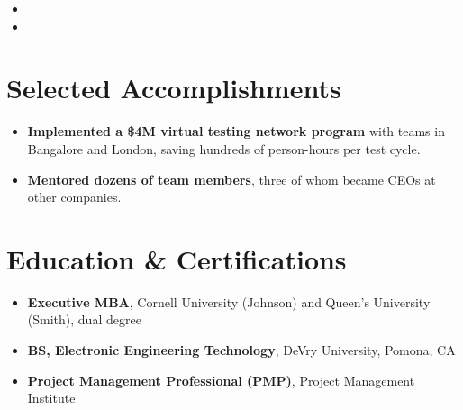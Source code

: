 \documentclass[11pt,letterpaper,sans]{moderncv}
\begin{document}
\begin{itemize}
\vspace{3pt}

\item{}

\vspace{3pt}

\item{}

\end{itemize}


\section{Selected Accomplishments}
\vspace{1pt}
\begin{itemize}
\item {\textbf{Implemented a \$4M virtual testing network program} with teams in Bangalore and London, saving hundreds of person-hours per test cycle.}
\item {\textbf{Mentored dozens of team members}, three of whom became CEOs at other companies.}
\end{itemize}


\section{Education \& Certifications}
\vspace{1pt}
\begin{itemize}
\item{\textbf{Executive MBA}, Cornell University (Johnson) and Queen's University (Smith), dual degree}
\item{\textbf{BS, Electronic Engineering Technology}, DeVry University, Pomona, CA}
\item{\textbf{Project Management Professional (PMP)}, Project Management Institute}
\end{itemize}
\end{document}
